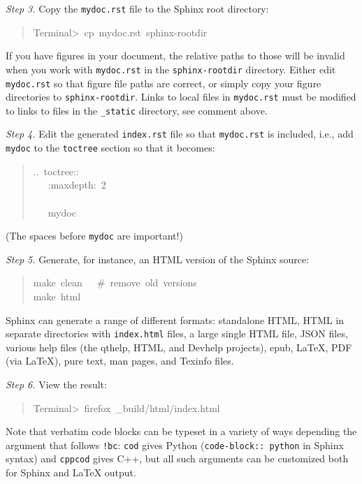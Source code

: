 \documentclass[a4paper]{article}
\begin{document}
\emph{Step 3.} Copy the \texttt{mydoc.rst} file to the Sphinx root directory:
%
\begin{quote}{\ttfamily \raggedright \noindent
Terminal>~cp~mydoc.rst~sphinx-rootdir
}
\end{quote}

If you have figures in your document, the relative paths to those will
be invalid when you work with \texttt{mydoc.rst} in the \texttt{sphinx-rootdir}
directory. Either edit \texttt{mydoc.rst} so that figure file paths are correct,
or simply copy your figure directories to \texttt{sphinx-rootdir}.
Links to local files in \texttt{mydoc.rst} must be modified to links to
files in the \texttt{\_static} directory, see comment above.

\emph{Step 4.} Edit the generated \texttt{index.rst} file so that \texttt{mydoc.rst}
is included, i.e., add \texttt{mydoc} to the \texttt{toctree} section so that it becomes:
%
\begin{quote}{\ttfamily \raggedright \noindent
..~toctree::\\
~~~:maxdepth:~2\\
~\\
~~~mydoc
}
\end{quote}

(The spaces before \texttt{mydoc} are important!)

\emph{Step 5.} Generate, for instance, an HTML version of the Sphinx source:
%
\begin{quote}{\ttfamily \raggedright \noindent
make~clean~~~\#~remove~old~versions\\
make~html
}
\end{quote}

Sphinx can generate a range of different formats:
standalone HTML, HTML in separate directories with \texttt{index.html} files,
a large single HTML file, JSON files, various help files (the qthelp, HTML,
and Devhelp projects), epub, LaTeX, PDF (via LaTeX), pure text, man pages,
and Texinfo files.

\emph{Step 6.} View the result:
%
\begin{quote}{\ttfamily \raggedright \noindent
Terminal>~firefox~\_build/html/index.html
}
\end{quote}

Note that verbatim code blocks can be typeset in a variety of ways
depending the argument that follows \texttt{!bc}: \texttt{cod} gives Python
(\texttt{code-block:: python} in Sphinx syntax) and \texttt{cppcod} gives C++, but
all such arguments can be customized both for Sphinx and LaTeX output.
\end{document}
